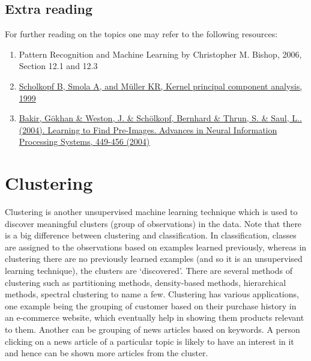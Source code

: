 \documentclass[12pt,a4paper]{article}
\begin{document}
\subsection{Extra reading}
For further reading on the topics one may refer to the following resources:
\begin{enumerate}
    \item Pattern Recognition and Machine Learning by Christopher M. Bishop, 2006, Section 12.1 and 12.3
    \item \href{https://axon.cs.byu.edu/~martinez/classes/778/Papers/KernelPCA.pdf}{Scholkopf B, Smola A, and Müller KR, Kernel principal component analysis, 1999}
    \item \href{https://www.researchgate.net/publication/41781235_Learning_to_Find_Pre-Images}{Bakir, Gökhan \& Weston, J. \& Schölkopf, Bernhard \& Thrun, S. \& Saul, L.. (2004). Learning to Find Pre-Images. Advances in Neural Information Processing Systems, 449-456 (2004)}
\end{enumerate}


\newpage
\section{Clustering}
Clustering is another unsupervised machine learning technique which is used to discover meaningful clusters (group of observations) in the data. Note that there is a big difference between clustering and classification. In classification, classes are assigned to the observations based on examples learned previously, whereas in clustering there are no previously learned examples (and so it is an unsupervised learning technique), the clusters are `discovered'. There are several methods of clustering such as partitioning methods, density-based methods, hierarchical methods, spectral clustering to name a few. Clustering has various applications, one example being the grouping of customer based on their purchase history in an e-commerce website, which eventually help in showing them products relevant to them. Another can be grouping of news articles based on keywords. A person clicking on a news article of a particular topic is likely to have an interest in it and hence can be shown more articles from the cluster.
\end{document}
